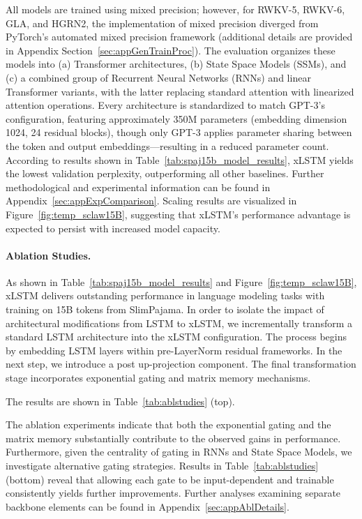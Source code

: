 All models are trained using mixed precision; however, for RWKV-5, RWKV-6, GLA, and HGRN2, the implementation of mixed precision diverged from PyTorch's automated mixed precision framework (additional details are provided in Appendix Section~\ref{sec:appGenTrainProc}). The evaluation organizes these models into (a) Transformer architectures, (b) State Space Models (SSMs), and (c) a combined group of Recurrent Neural Networks (RNNs) and linear Transformer variants, with the latter replacing standard attention with linearized attention operations. Every architecture is standardized to match GPT-3's configuration, featuring approximately 350M parameters (embedding dimension 1024, 24 residual blocks), though only GPT-3 applies parameter sharing between the token and output embeddings—resulting in a reduced parameter count. According to results shown in Table~\ref{tab:spaj15b_model_results}, xLSTM yields the lowest validation perplexity, outperforming all other baselines. Further methodological and experimental information can be found in Appendix~\ref{sec:appExpComparison}. Scaling results are visualized in Figure~\ref{fig:temp_sclaw15B}, suggesting that xLSTM’s performance advantage is expected to persist with increased model capacity.

\paragraph{Ablation Studies.}
As shown in Table~\ref{tab:spaj15b_model_results} and Figure~\ref{fig:temp_sclaw15B}, xLSTM delivers outstanding performance in language modeling tasks with training on 15B tokens from SlimPajama. In order to isolate the impact of architectural modifications from LSTM to xLSTM, we incrementally transform a standard LSTM architecture into the xLSTM configuration. The process begins by embedding LSTM layers within pre-LayerNorm residual frameworks. In the next step, we introduce a post up-projection component. The final transformation stage incorporates exponential gating and matrix memory mechanisms.

The results are shown in Table~\ref{tab:ablstudies} (top). 

The ablation experiments indicate that both the exponential gating and the matrix memory substantially contribute to the observed gains in performance. Furthermore, given the centrality of gating in RNNs and State Space Models, we investigate alternative gating strategies. Results in Table~\ref{tab:ablstudies} (bottom) reveal that allowing each gate to be input-dependent and trainable consistently yields further improvements. Further analyses examining separate backbone elements can be found in Appendix~\ref{sec:appAblDetails}.

